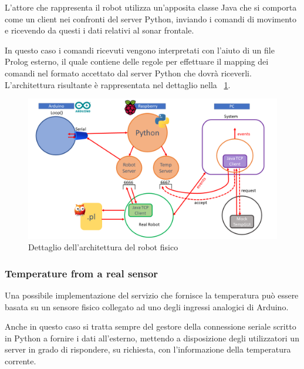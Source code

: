 \documentclass{../llncs}
\newcommand{\labelfig}[1]{\label{fig:#1}}
\newcommand{\xf}[1]{\figurename~\ref{fig:#1}}
\begin{document}
L'attore che rappresenta il robot utilizza un'apposita classe Java che si comporta come un client nei confronti del server Python, inviando i comandi di movimento e ricevendo da questi i dati relativi al sonar frontale.

In questo caso i comandi ricevuti vengono interpretati con l'aiuto di un file Prolog esterno, il quale contiene delle regole per effettuare il mapping dei comandi nel formato accettato dal server Python che dovrà riceverli.\\

L'architettura risultante è rappresentata nel dettaglio nella \xf{raspInteractions}.

\begin{figure}[!htb]
\centering
\includegraphics[scale=0.40]{img/raspberryInteraction.png}
\caption{Dettaglio dell'architettura del robot fisico}\labelfig{raspInteractions}
\end{figure}

\subsubsection{Temperature from a real sensor}
Una possibile implementazione del servizio che fornisce la temperatura può essere basata su un sensore fisico collegato ad uno degli ingressi analogici di Arduino.

Anche in questo caso si tratta sempre del gestore della connessione seriale scritto in Python a fornire i dati all'esterno, mettendo a disposizione degli utilizzatori un server in grado di rispondere, su richiesta, con l'informazione della temperatura corrente.


\end{document}
